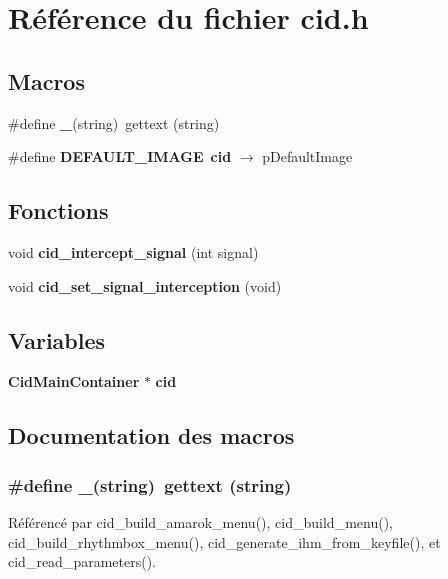 \section{Référence du fichier cid.h}
\label{cid_8h}
\subsection*{Macros}
\begin{CompactItemize}
\item 
\#define {\bf \_\-}(string)~gettext (string)
\item 
\#define {\bf DEFAULT\_\-IMAGE}~{\bf cid} $\rightarrow$ pDefaultImage
\end{CompactItemize}
\subsection*{Fonctions}
\begin{CompactItemize}
\item 
void {\bf cid\_\-intercept\_\-signal} (int signal)
\item 
void {\bf cid\_\-set\_\-signal\_\-interception} (void)
\end{CompactItemize}
\subsection*{Variables}
\begin{CompactItemize}
\item 
{\bf CidMainContainer} $\ast$ {\bf cid}
\end{CompactItemize}


\subsection{Documentation des macros}
\subsubsection{\setlength{\rightskip}{0pt plus 5cm}\#define \_\-(string)~gettext (string)}\label{cid_8h_a9bd4034a10d8f6a33b6c8e6416eac00}




Référencé par cid\_\-build\_\-amarok\_\-menu(), cid\_\-build\_\-menu(), cid\_\-build\_\-rhythmbox\_\-menu(), cid\_\-generate\_\-ihm\_\-from\_\-keyfile(), et cid\_\-read\_\-parameters().
